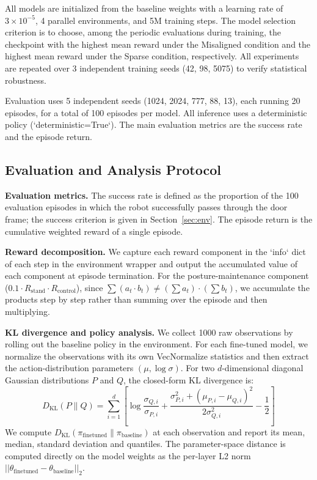All models are initialized from the baseline weights with a learning rate of $3\times10^{-5}$, 4 parallel environments, and 5M training steps. The model selection criterion is to choose, among the periodic evaluations during training, the checkpoint with the highest mean reward under the Misaligned condition and the highest mean reward under the Sparse condition, respectively. All experiments are repeated over 3 independent training seeds (42, 98, 5075) to verify statistical robustness.

Evaluation uses 5 independent seeds (1024, 2024, 777, 88, 13), each running 20 episodes, for a total of 100 episodes per model. All inference uses a deterministic policy (`deterministic=True`). The main evaluation metrics are the success rate and the episode return.

\subsection{Evaluation and Analysis Protocol}

\textbf{Evaluation metrics.} The success rate is defined as the proportion of the 100 evaluation episodes in which the robot successfully passes through the door frame; the success criterion is given in Section~\ref{sec:env}. The episode return is the cumulative weighted reward of a single episode.

\textbf{Reward decomposition.} We capture each reward component in the `info` dict of each step in the environment wrapper and output the accumulated value of each component at episode termination. For the posture-maintenance component ($0.1 \cdot R_\text{stand} \cdot R_\text{control}$), since $\sum (a_t \cdot b_t) \neq (\sum a_t) \cdot (\sum b_t)$, we accumulate the products step by step rather than summing over the episode and then multiplying.

\textbf{KL divergence and policy analysis.} We collect 1000 raw observations by rolling out the baseline policy in the environment. For each fine-tuned model, we normalize the observations with its own VecNormalize statistics and then extract the action-distribution parameters $(\mu, \log\sigma)$. For two $d$-dimensional diagonal Gaussian distributions $P$ and $Q$, the closed-form KL divergence is:
\begin{equation}
  D_{\text{KL}}(P \parallel Q) = \sum_{i=1}^{d} \left[ \log\frac{\sigma_{Q,i}}{\sigma_{P,i}} + \frac{\sigma_{P,i}^2 + (\mu_{P,i} - \mu_{Q,i})^2}{2\sigma_{Q,i}^2} - \frac{1}{2} \right]
\end{equation}
We compute $D_{\text{KL}}(\pi_\text{finetuned} \parallel \pi_\text{baseline})$ at each observation and report its mean, median, standard deviation and quantiles. The parameter-space distance is computed directly on the model weights as the per-layer L2 norm $||\theta_\text{finetuned} - \theta_\text{baseline}||_2$.

